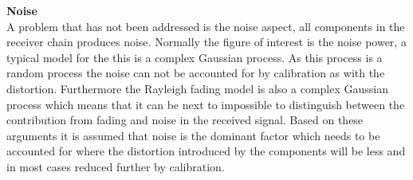 %
%
%
\textbf{Noise}\\
A problem that has not been addressed is the noise aspect, all components in the receiver chain produces noise. Normally the figure of interest is the noise power, a typical model for the this is a complex Gaussian process. As this process is a random process the noise can not be accounted for by calibration as with the distortion. Furthermore the Rayleigh fading model is also a complex Gaussian process which means that it can be next to impossible to distinguish between the contribution from fading and noise in the received signal. Based on these arguments it is assumed that noise is the dominant factor which needs to be accounted for where the distortion introduced by the components will be less and in most cases reduced further by calibration.



